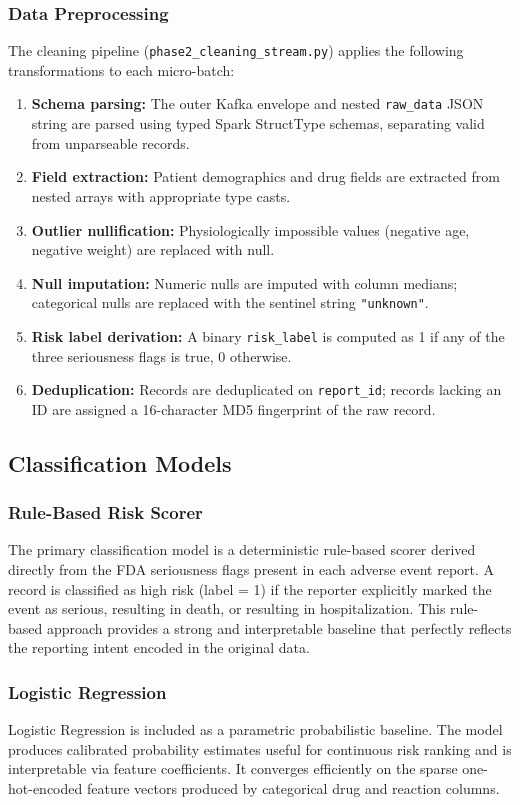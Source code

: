 \documentclass[conference]{IEEEtran}
\begin{document}
\subsubsection{Data Preprocessing}
The cleaning pipeline (\texttt{phase2\_cleaning\_stream.py}) applies the following transformations to each micro-batch:
\begin{enumerate}
    \item \textbf{Schema parsing:} The outer Kafka envelope and nested \texttt{raw\_data} JSON string are parsed using typed Spark StructType schemas, separating valid from unparseable records.
    \item \textbf{Field extraction:} Patient demographics and drug fields are extracted from nested arrays with appropriate type casts.
    \item \textbf{Outlier nullification:} Physiologically impossible values (negative age, negative weight) are replaced with null.
    \item \textbf{Null imputation:} Numeric nulls are imputed with column medians; categorical nulls are replaced with the sentinel string \texttt{"unknown"}.
    \item \textbf{Risk label derivation:} A binary \texttt{risk\_label} is computed as 1 if any of the three seriousness flags is true, 0 otherwise.
    \item \textbf{Deduplication:} Records are deduplicated on \texttt{report\_id}; records lacking an ID are assigned a 16-character MD5 fingerprint of the raw record.
\end{enumerate}

\subsection{Classification Models}

\subsubsection{Rule-Based Risk Scorer}
The primary classification model is a deterministic rule-based scorer derived directly from the FDA seriousness flags present in each adverse event report. A record is classified as high risk (label = 1) if the reporter explicitly marked the event as serious, resulting in death, or resulting in hospitalization. This rule-based approach provides a strong and interpretable baseline that perfectly reflects the reporting intent encoded in the original data.

\subsubsection{Logistic Regression}
Logistic Regression is included as a parametric probabilistic baseline. The model produces calibrated probability estimates useful for continuous risk ranking and is interpretable via feature coefficients. It converges efficiently on the sparse one-hot-encoded feature vectors produced by categorical drug and reaction columns.
\end{document}
